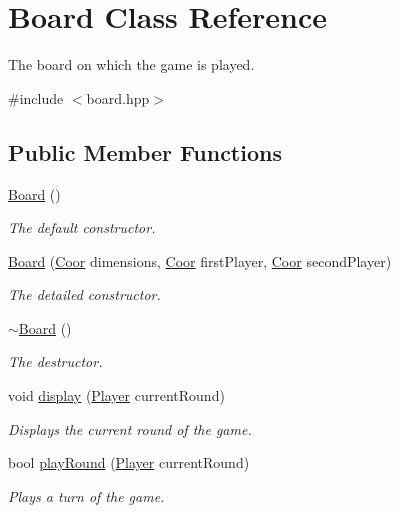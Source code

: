 \hypertarget{class_board}{\section{Board Class Reference}
\label{class_board}
}


The board on which the game is played.  




{\ttfamily \#include $<$board.\-hpp$>$}

\subsection*{Public Member Functions}
\begin{DoxyCompactItemize}
\item 
\hyperlink{class_board_a9ee491d4fea680cf69b033374a9fdfcb}{Board} ()
\begin{DoxyCompactList}\small\item\em The default constructor. \end{DoxyCompactList}\item 
\hyperlink{class_board_acb42f748f5e2bb955579c5bc7edab939}{Board} (\hyperlink{common_8hpp_af5a69199868671fc85779715443d7e7d}{Coor} dimensions, \hyperlink{common_8hpp_af5a69199868671fc85779715443d7e7d}{Coor} first\-Player, \hyperlink{common_8hpp_af5a69199868671fc85779715443d7e7d}{Coor} second\-Player)
\begin{DoxyCompactList}\small\item\em The detailed constructor. \end{DoxyCompactList}\item 
\hyperlink{class_board_af73f45730119a1fd8f6670f53f959e68}{$\sim$\-Board} ()
\begin{DoxyCompactList}\small\item\em The destructor. \end{DoxyCompactList}\item 
void \hyperlink{class_board_af0d3cbab40c45a20d39e27f440edbf96}{display} (\hyperlink{common_8hpp_a64071507b27c62fbdfefd4e0d29e5f81}{Player} current\-Round)
\begin{DoxyCompactList}\small\item\em Displays the current round of the game. \end{DoxyCompactList}\item 
bool \hyperlink{class_board_a9d3c9e23911793a5c0ac30a07d602edf}{play\-Round} (\hyperlink{common_8hpp_a64071507b27c62fbdfefd4e0d29e5f81}{Player} current\-Round)
\begin{DoxyCompactList}\small\item\em Plays a turn of the game. \end{DoxyCompactList}\end{DoxyCompactItemize}
